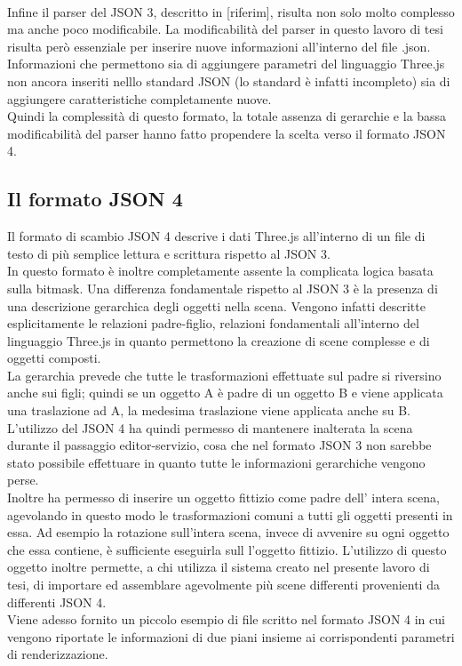 \\
Infine il parser del JSON 3, descritto in [riferim], risulta non solo molto complesso ma anche poco modificabile. La modificabilità del parser in questo lavoro di tesi risulta però essenziale per inserire nuove informazioni all’interno del file .json. Informazioni che permettono sia di aggiungere parametri del linguaggio Three.js non ancora inseriti nelllo standard JSON (lo standard è infatti incompleto) sia di aggiungere caratteristiche completamente nuove.
\\
Quindi la complessità di questo formato, la totale assenza di gerarchie e la bassa modificabilità del parser hanno fatto propendere la scelta verso il formato JSON 4.

\subsection{Il formato JSON 4}
\label{sec:formato_scambio_formato_json4}

Il formato di scambio JSON 4 descrive i dati Three.js all’interno di un file di testo di più semplice lettura e scrittura rispetto al JSON 3.
\\
In questo formato è inoltre completamente assente la complicata logica basata sulla bitmask.
Una differenza fondamentale rispetto al JSON 3 è la presenza di una descrizione gerarchica degli oggetti nella scena. Vengono infatti descritte esplicitamente le relazioni padre-figlio, relazioni fondamentali all’interno del linguaggio Three.js in quanto permettono la creazione di scene complesse e di oggetti composti.
\\
La gerarchia prevede che tutte le trasformazioni effettuate sul padre si riversino anche sui figli; quindi se un oggetto A è padre di un oggetto B e viene applicata una traslazione ad A, la medesima traslazione viene applicata anche su B. 
\\
L’utilizzo del JSON 4 ha quindi permesso di mantenere inalterata la scena durante il passaggio editor-servizio, cosa che nel formato JSON 3 non sarebbe stato possibile effettuare in quanto tutte le informazioni gerarchiche vengono perse. 
\\
Inoltre ha permesso di inserire un oggetto fittizio come padre dell’ intera scena, agevolando in questo modo le trasformazioni comuni a tutti gli oggetti presenti in essa. 
Ad esempio la rotazione sull’intera scena, invece di avvenire su ogni oggetto che essa contiene, è sufficiente eseguirla sull l’oggetto fittizio.
L’utilizzo di questo oggetto inoltre permette, a chi utilizza il sistema creato nel presente lavoro di tesi, di importare ed assemblare agevolmente più scene differenti provenienti da differenti JSON 4. 
\\
Viene adesso fornito un piccolo esempio di file scritto nel formato JSON 4 in cui vengono riportate le informazioni di due piani insieme ai corrispondenti parametri di renderizzazione.



